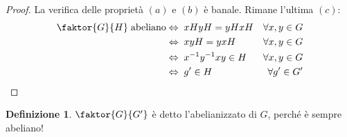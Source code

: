 \documentclass[a4paper]{article}
\theoremstyle{remark}
\theoremstyle{definition}
\newtheorem{definition}[theorem]{Definizione}
\begin{document}
\begin{multicols}{2}
\begin{enumerate}
\begin{proof}
	La verifica delle proprietà $ (a) $ e $ (b) $ è banale. Rimane l'ultima $ (c) $:
	\begin{align*}
	\faktor{G}{H} \;\text{abeliano} & \Leftrightarrow\; xHyH = yHxH &\forall x, y \in G \\
	& \Leftrightarrow\; xyH = yxH &\forall x, y \in G\\
	& \Leftrightarrow\; x^{-1}y^{-1}xy \in H &\forall x, y \in G\\
	& \Leftrightarrow\; g' \in H &\forall g' \in G'
	\end{align*}
\end{proof}
\begin{definition}
	$ \faktor{G}{G'} $ è detto l'abelianizzato di $ G $, perché è sempre abeliano!
\end{definition}
\end{enumerate}
\end{multicols}
\end{document}
